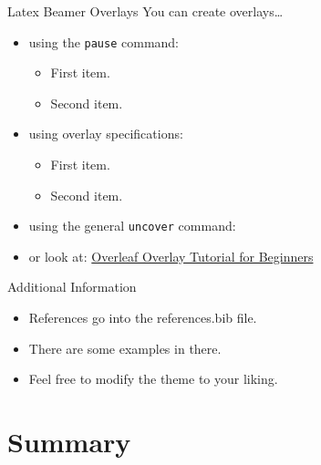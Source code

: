\documentclass[aspectratio=1610]{beamer}
\begin{document}
\begin{frame}{Latex Beamer Overlays}
  You can create overlays\dots
  \begin{itemize}
    \item using the \texttt{pause} command:
    \begin{itemize}
      \item First item.
      \pause
      \item Second item.
    \end{itemize}
    \item using overlay specifications:
    \begin{itemize}
      \item<3-> First item.
      \item<4-> Second item.
    \end{itemize}
    \item using the general \texttt{uncover} command:
    \begin{itemize}
    \end{itemize}
    \item<7-> or look at: \href{https://www.overleaf.com/learn/latex/Beamer_Presentations\%3A_A_Tutorial_for_Beginners_(Part_4)\%E2\%80\%94Overlay_Specifications}{Overleaf Overlay Tutorial for Beginners}
  \end{itemize}
\end{frame}


\begin{frame}{Additional Information}
  \begin{itemize}
    \item References go into the references.bib file.
    \item There are some examples \cite{biblatex,einstein} in there.
    \item Feel free to modify the theme to your liking.
  \end{itemize}
\end{frame}


\section*{Summary}
\end{document}
